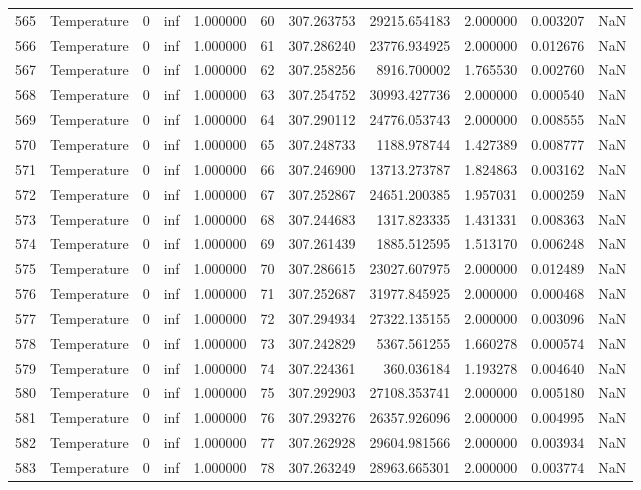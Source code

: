 \begin{tabular}{llrrrrrrrrr}
565 & Temperature & 0 & inf & 1.000000 & 60 & 307.263753 & 29215.654183 & 2.000000 & 0.003207 & NaN \\
566 & Temperature & 0 & inf & 1.000000 & 61 & 307.286240 & 23776.934925 & 2.000000 & 0.012676 & NaN \\
567 & Temperature & 0 & inf & 1.000000 & 62 & 307.258256 & 8916.700002 & 1.765530 & 0.002760 & NaN \\
568 & Temperature & 0 & inf & 1.000000 & 63 & 307.254752 & 30993.427736 & 2.000000 & 0.000540 & NaN \\
569 & Temperature & 0 & inf & 1.000000 & 64 & 307.290112 & 24776.053743 & 2.000000 & 0.008555 & NaN \\
570 & Temperature & 0 & inf & 1.000000 & 65 & 307.248733 & 1188.978744 & 1.427389 & 0.008777 & NaN \\
571 & Temperature & 0 & inf & 1.000000 & 66 & 307.246900 & 13713.273787 & 1.824863 & 0.003162 & NaN \\
572 & Temperature & 0 & inf & 1.000000 & 67 & 307.252867 & 24651.200385 & 1.957031 & 0.000259 & NaN \\
573 & Temperature & 0 & inf & 1.000000 & 68 & 307.244683 & 1317.823335 & 1.431331 & 0.008363 & NaN \\
574 & Temperature & 0 & inf & 1.000000 & 69 & 307.261439 & 1885.512595 & 1.513170 & 0.006248 & NaN \\
575 & Temperature & 0 & inf & 1.000000 & 70 & 307.286615 & 23027.607975 & 2.000000 & 0.012489 & NaN \\
576 & Temperature & 0 & inf & 1.000000 & 71 & 307.252687 & 31977.845925 & 2.000000 & 0.000468 & NaN \\
577 & Temperature & 0 & inf & 1.000000 & 72 & 307.294934 & 27322.135155 & 2.000000 & 0.003096 & NaN \\
578 & Temperature & 0 & inf & 1.000000 & 73 & 307.242829 & 5367.561255 & 1.660278 & 0.000574 & NaN \\
579 & Temperature & 0 & inf & 1.000000 & 74 & 307.224361 & 360.036184 & 1.193278 & 0.004640 & NaN \\
580 & Temperature & 0 & inf & 1.000000 & 75 & 307.292903 & 27108.353741 & 2.000000 & 0.005180 & NaN \\
581 & Temperature & 0 & inf & 1.000000 & 76 & 307.293276 & 26357.926096 & 2.000000 & 0.004995 & NaN \\
582 & Temperature & 0 & inf & 1.000000 & 77 & 307.262928 & 29604.981566 & 2.000000 & 0.003934 & NaN \\
583 & Temperature & 0 & inf & 1.000000 & 78 & 307.263249 & 28963.665301 & 2.000000 & 0.003774 & NaN \\

\end{tabular}
